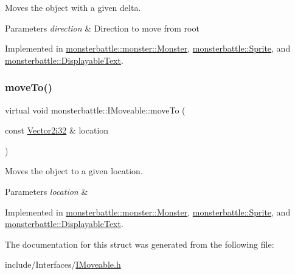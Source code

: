 Moves the object with a given delta. 


\begin{DoxyParams}{Parameters}
{\em direction} & Direction to move from root \\
\hline
\end{DoxyParams}


Implemented in \hyperlink{classmonsterbattle_1_1monster_1_1Monster_a3ba3e637c132c737dd5c19de3932dc18}{monsterbattle\+::monster\+::\+Monster}, \hyperlink{classmonsterbattle_1_1Sprite_a4eae41525289f126bc83b326c3be7907}{monsterbattle\+::\+Sprite}, and \hyperlink{classmonsterbattle_1_1DisplayableText_adeeb4a77f3137a943cbea2baaccef657}{monsterbattle\+::\+Displayable\+Text}.

\mbox{\label{structmonsterbattle_1_1IMoveable_a61cc433b2a635cc3c52d807fc446a6a4}} 
\subsubsection{\texorpdfstring{move\+To()}{moveTo()}}
{\footnotesize\ttfamily virtual void monsterbattle\+::\+I\+Moveable\+::move\+To (\begin{DoxyParamCaption}\item[{const \hyperlink{structmonsterbattle_1_1Vector}{Vector2i32} \&}]{location }\end{DoxyParamCaption})\hspace{0.3cm}{\ttfamily [pure virtual]}}



Moves the object to a given location. 


\begin{DoxyParams}{Parameters}
{\em location} & \\
\hline
\end{DoxyParams}


Implemented in \hyperlink{classmonsterbattle_1_1monster_1_1Monster_ac256c749ccdbec0390da7949827b4851}{monsterbattle\+::monster\+::\+Monster}, \hyperlink{classmonsterbattle_1_1Sprite_adf499d36bc202a30c3313a98d9f93d6f}{monsterbattle\+::\+Sprite}, and \hyperlink{classmonsterbattle_1_1DisplayableText_afa4e1b76469663073b133d6358329887}{monsterbattle\+::\+Displayable\+Text}.



The documentation for this struct was generated from the following file\+:\begin{DoxyCompactItemize}
\item 
include/\+Interfaces/\hyperlink{IMoveable_8h}{I\+Moveable.\+h}\end{DoxyCompactItemize}
